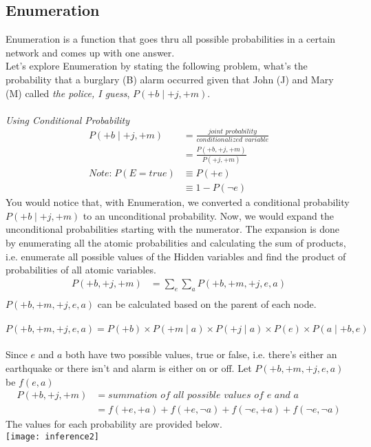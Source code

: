 \documentclass[12pt]{article}
\begin{document}
\subsection{Enumeration}
\par
Enumeration is a function that goes thru all possible probabilities in a certain network and comes up with one answer.\\
Let's explore Enumeration by stating the following problem, what's the probability that a burglary (B) alarm occurred given that John (J) and Mary (M) called \textit{the police, I guess}, \(P(+b\mid +j, +m)\).\\\\
\textit{Using Conditional Probability}
\begin{align*}
P(+b\mid +j, +m) &= \frac{\textit{joint probability}}{\textit{conditionalized variable}}\\
&= \frac{P(+b, +j, +m)}{P(+j, +m)}\\
\textit{Note:}\;P(E = true) &\equiv P(+e)\\
 &\equiv 1 - P(\neg e)
\end{align*}
You would notice that, with Enumeration, we converted a conditional probability \(P(+b\mid +j, +m)\) to an unconditional probability. Now, we would expand the unconditional probabilities starting with the numerator. The expansion is done by enumerating all the atomic probabilities and calculating the sum of products, i.e. enumerate all possible values of the Hidden variables and find the product of probabilities of all atomic variables.
\begin{align*}
P(+b, +j, +m) &= \sum_{e} \sum_{a} P(+b, +m, +j, e, a)\\
\end{align*}
\(P(+b, +m, +j, e, a)\) can be calculated based on the parent of each node.\\\\
\(P(+b, +m, +j, e, a) = P(+b) \times P(+m \mid a) \times P(+j \mid a) \times P(e) \times P(a \mid +b, e)\)\\\\
Since \(e\) and \(a\) both have two possible values, true or false, i.e. there's either an earthquake or there isn't and alarm is either on or off.
Let \(P(+b, +m, +j, e, a)\) be \(f(e, a)\)\\
\begin{align*}
P(+b, +j, +m) &= \textit{summation of all possible values of \(e\) and \(a\)}\\
&= f(+e, +a) + f(+e, \neg a) + f(\neg e, +a) + f(\neg e, \neg a)
\end{align*}
The values for each probability are provided below.\\
\texttt{[image: inference2]}
\end{document}
